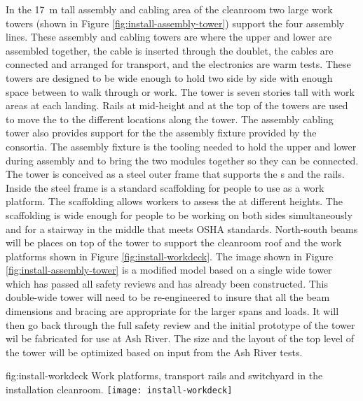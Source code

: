 In the \SI{17}{m} tall   assembly and cabling area of the cleanroom two large work towers (shown in Figure \ref{fig:install-assembly-tower}) support the four assembly lines. 
These  assembly and cabling towers are where the upper and lower  are assembled together, the  cable is inserted through the  doublet, the cables are connected and arranged for transport, and the electronics are warm tests. 
These towers are designed to be wide enough to hold two  side by side with enough space between to walk through or work. 
The tower is seven stories tall with work areas at each landing.
Rails at mid-height and at the top of the towers are used to move the  to the different locations along the tower. 
The  assembly cabling tower also provides support for the the  assembly fixture provided by the  consortia. 
The  assembly fixture is the tooling needed to hold the upper and lower  during assembly and to bring the two modules together so they can be connected. 
The  tower is conceived as a steel outer frame that supports the s and the rails. Inside the steel frame is a standard scaffolding for people to use as a work platform. 
The scaffolding allows workers to assess the  at different heights. 
The scaffolding is wide enough for people to be working on both sides simultaneously and for a stairway in the middle that meets OSHA standards. 
North-south beams will be places on top of the tower to support the cleanroom roof and the work platforms shown in Figure \ref{fig:install-workdeck}.
The image shown in Figure \ref{fig:install-assembly-tower} is a modified model based on a single wide  tower which has passed all safety reviews and has already been constructed. 
This double-wide tower will need to be re-engineered to insure that all the beam dimensions and bracing are appropriate for the larger spans and loads. 
It will then go back through the full safety review and the initial prototype of the tower wil be fabricated for use at Ash River. 
The size and the layout of the top level of the tower will be optimized based on input from the Ash River tests. 


\begin{dunefigure}{fig:install-workdeck}
  {Work platforms, transport rails and switchyard in the installation cleanroom. }
\texttt{[image: install-workdeck]}
\end{dunefigure}

